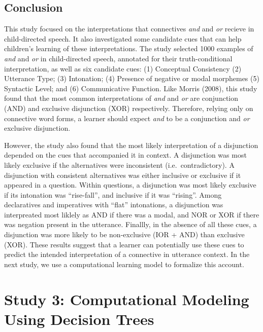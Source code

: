 \documentclass[,man,floatsintext]{apa6}
\begin{document}
\hypertarget{conclusion}{%
\subsection{Conclusion}\label{conclusion}}

This study focused on the interpretations that connectives \emph{and} and \emph{or} recieve in child-directed speech. It also investigated some candidate cues that can help children's learning of these interpretations. The study selected 1000 examples of \emph{and} and \emph{or} in child-directed speech, annotated for their truth-conditional interpretation, as well as six candidate cues: (1) Conceptual Consistency (2) Utterance Type; (3) Intonation; (4) Presence of negative or modal morphemes (5) Syntactic Level; and (6) Communicative Function. Like Morris (2008), this study found that the most common interpretations of \emph{and} and \emph{or} are conjunction (AND) and exclusive disjunction (XOR) respectively. Therefore, relying only on connective word forms, a learner should expect \emph{and} to be a conjunction and \emph{or} exclusive disjunction.

However, the study also found that the most likely interpretation of a disjunction depended on the cues that accompanied it in context. A disjunction was most likely exclusive if the alternatives were inconsistent (i.e.~contradictory). A disjunction with consistent alternatives was either inclusive or exclusive if it appeared in a question. Within questions, a disjunction was most likely exclusive if its intonation was \enquote{rise-fall}, and inclusive if it was \enquote{rising}. Among declaratives and imperatives with \enquote{flat} intonations, a disjunction was interpreated most liklely as AND if there was a modal, and NOR or XOR if there was negation present in the utterance. Finallly, in the absence of all these cues, a disjunction was more likely to be non-exclusive (IOR + AND) than exclusive (XOR). These results suggest that a learner can potentially use these cues to predict the intended interpretation of a connective in utterance context. In the next study, we use a computational learning model to formalize this account.

\hypertarget{study-3-computational-modeling-using-decision-trees}{%
\section{Study 3: Computational Modeling Using Decision Trees}\label{study-3-computational-modeling-using-decision-trees}}
\end{document}

